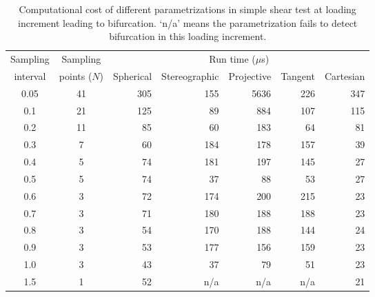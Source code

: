 \documentclass[12pt]{article}
\numberwithin{equation}{section}
\begin{document}
\begin{table}[H]
  \begin{center}
    \begin{tabular}{c c | r r r r r}
      \toprule
      Sampling   & Sampling &   \multicolumn{5}{c}{Run time ($\mu$s)}	\\   
      interval     & points ($N$)     &  Spherical    &   Stereographic  &   Projective  &   Tangent   & Cartesian  \\
      \midrule         
      0.05      &      41     &    305        &       155       &       5636      &      226       &       347         \\
      0.1        &      21     &    125        &       89         &       884        &      107       &       115         \\
      0.2        &      11     &    85          &       60         &       183        &      64         &       81         \\
      0.3        &      7       &    60          &       184       &       178        &      157       &       39          \\
      0.4        &      5       &    74          &       181       &       197        &      145       &       27          \\       
      0.5        &	    5       &    74          &       37         &       88          &      53         &       27          \\
      0.6        &	    3       &    72          &       174       &       200        &      215       &       23          \\
      0.7        &	    3       &    71	      &       180       &       188        &      188       &       23          \\
      0.8        &      3       &    54          &       170       &       188        &      144       &       24          \\	      
      0.9        &	    3       &    53          &       177       &       156        &      159       &       23          \\	
      1.0        &      3	     &    43	      &       37         &       79          &      51         &       23          \\	
      1.5        &	    1       &    52	      &       n/a        &       n/a         &      n/a        &       21          \\	       
      \bottomrule
    \end{tabular}
    \caption{Computational cost of different parametrizations in 
    simple shear test at loading increment leading to bifurcation. 
    `n/a' means the parametrization fails to detect bifurcation in 
    this loading increment.}
    \label{tab:iso_shear_runtime}
  \end{center}
\end{table}
\end{document}
